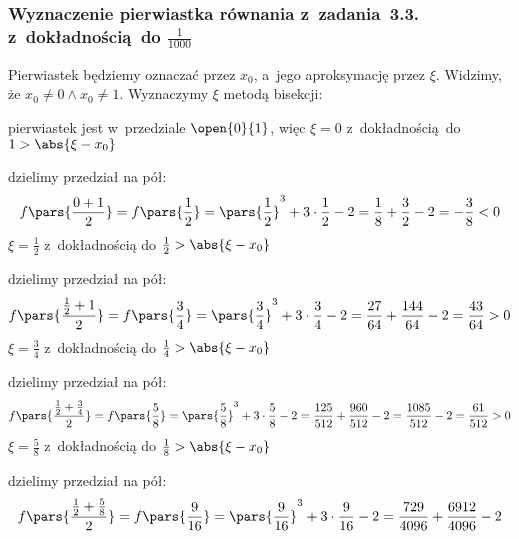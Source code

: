 \subsubsection*{Wyznaczenie pierwiastka równania z~zadania~3.3. z~dokładnością do \(\frac{1}{1000}\)}
Pierwiastek będziemy oznaczać przez \(x_0\), a~jego aproksymację przez \(\xi\). Widzimy, że \(x_0 \neq 0 \land x_0 \neq 1\). Wyznaczymy \(\xi\) metodą bisekcji:
\begin{proofcases}
    \item pierwiastek jest w~przedziale \(\open{0}{1}\), więc \(\xi = 0\) z~dokładnością do \(1 > \abs{\xi - x_0}\)
    \item dzielimy przedział na pół:
        \begin{equation*}
            f\pars{\frac{0 + 1}{2}}
                = f\pars{\frac{1}{2}}
                = \pars{\frac{1}{2}}^3 + 3 \cdot \frac{1}{2} - 2
                = \frac{1}{8} + \frac{3}{2} - 2 = -\frac{3}{8}
                < 0
        \end{equation*}
        \(\xi = \frac{1}{2}\) z~dokładnością do \(\frac{1}{2} > \abs{\xi - x_0}\)
    \item dzielimy przedział na pół:
        \begin{equation*}
            f\pars{\frac{\frac{1}{2} + 1}{2}}
                = f\pars{\frac{3}{4}}
                = \pars{\frac{3}{4}}^3 + 3 \cdot \frac{3}{4} - 2
                = \frac{27}{64} + \frac{144}{64} - 2
                = \frac{43}{64}
                > 0
        \end{equation*}
        \(\xi = \frac{3}{4}\) z~dokładnością do \(\frac{1}{4} > \abs{\xi - x_0}\)
    \item dzielimy przedział na pół:
        \begin{equation*}
            f\pars{\frac{\frac{1}{2} + \frac{3}{4}}{2}}
                = f\pars{\frac{5}{8}}
                = \pars{\frac{5}{8}}^3 + 3 \cdot \frac{5}{8} - 2
                = \frac{125}{512} + \frac{960}{512} - 2
                = \frac{1085}{512} - 2
                = \frac{61}{512}
                > 0
        \end{equation*}
        \(\xi = \frac{5}{8}\) z~dokładnością do \(\frac{1}{8} > \abs{\xi - x_0}\)
    \item dzielimy przedział na pół:
        \begin{equation*}
            f\pars{\frac{\frac{1}{2} + \frac{5}{8}}{2}}
                = f\pars{\frac{9}{16}}
                = \pars{\frac{9}{16}}^3 + 3 \cdot \frac{9}{16} - 2
                = \frac{729}{4096} + \frac{6912}{4096} - 2

\end{equation*}
\end{proofcases}

